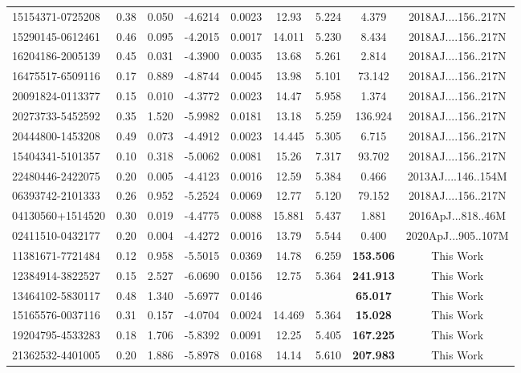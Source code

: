 \begin{tabular}{lcccccccc}
15154371-0725208 & 0.38 & 0.050 & -4.6214 & 0.0023 & 12.93 & 5.224 & 4.379 & 2018AJ....156..217N  \\
15290145-0612461 & 0.46 & 0.095 & -4.2015 & 0.0017 & 14.011 & 5.230 & 8.434 & 2018AJ....156..217N  \\
16204186-2005139 & 0.45 & 0.031 & -4.3900 & 0.0035 & 13.68 & 5.261 & 2.814 & 2018AJ....156..217N  \\
16475517-6509116 & 0.17 & 0.889 & -4.8744 & 0.0045 & 13.98 & 5.101 & 73.142 & 2018AJ....156..217N  \\
20091824-0113377 & 0.15 & 0.010 & -4.3772 & 0.0023 & 14.47 & 5.958 & 1.374 & 2018AJ....156..217N  \\
20273733-5452592 & 0.35 & 1.520 & -5.9982 & 0.0181 & 13.18 & 5.259 & 136.924 & 2018AJ....156..217N  \\
20444800-1453208 & 0.49 & 0.073 & -4.4912 & 0.0023 & 14.445 & 5.305 & 6.715 & 2018AJ....156..217N  \\
15404341-5101357 & 0.10 & 0.318 & -5.0062 & 0.0081 & 15.26 & 7.317 & 93.702 & 2018AJ....156..217N  \\
22480446-2422075 & 0.20 & 0.005 & -4.4123 & 0.0016 & 12.59 & 5.384 & 0.466 & 2013AJ....146..154M  \\
06393742-2101333 & 0.26 & 0.952 & -5.2524 & 0.0069 & 12.77 & 5.120 & 79.152 & 2018AJ....156..217N  \\
04130560+1514520 & 0.30 & 0.019 & -4.4775 & 0.0088 & 15.881 & 5.437 & 1.881 & 2016ApJ...818..46M  \\
02411510-0432177 & 0.20 & 0.004 & -4.4272 & 0.0016 & 13.79 & 5.544 & 0.400 & 2020ApJ...905..107M  \\
  11381671-7721484 & 0.12 & 0.958 & -5.5015 & 0.0369 & 14.78 & 6.259 & \textbf{153.506} & This Work  \\
  12384914-3822527 & 0.15 & 2.527 & -6.0690 & 0.0156 & 12.75 & 5.364 & \textbf{241.913} & This Work  \\
  13464102-5830117 & 0.48 & 1.340 & -5.6977 & 0.0146 &  &  & \textbf{65.017} & This Work  \\
  15165576-0037116 & 0.31 & 0.157 & -4.0704 & 0.0024 & 14.469 & 5.364 & \textbf{15.028} & This Work  \\
  19204795-4533283 & 0.18 & 1.706 & -5.8392 & 0.0091 & 12.25 & 5.405 & \textbf{167.225} & This Work  \\
  21362532-4401005 & 0.20 & 1.886 & -5.8978 & 0.0168 & 14.14 & 5.610 & \textbf{207.983} & This Work  \\
\hline
\end{tabular}


